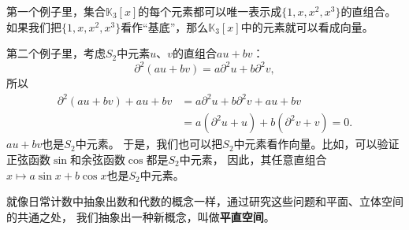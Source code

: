 \documentclass[12pt,UTF8]{ctexbook}
\begin{document}
第一个例子里，集合$\mathbb{K}_3[x]$的每个元素都可以唯一表示成$\{1, x, x^2, x^3\}$的直组合。
如果我们把$\{1, x, x^2, x^3\}$看作“基底”，那么$\mathbb{K}_3[x]$中的元素就可以看成向量。

第二个例子里，考虑$S_2$中元素$u$、$v$的直组合$au + bv$：
$$ \partial^2 (au + bv) = a \partial^2 u + b \partial^2 v,$$
所以
\begin{align*}
    \partial^2 (au + bv) + au + bv &= a \partial^2 u + b \partial^2 v + au + bv  \\
    &= a(\partial^2 u + u) + b(\partial^2 v + v) = 0.  
\end{align*}
$au + bv$也是$S_2$中元素。
于是，我们也可以把$S_2$中元素看作向量。比如，可以验证正弦函数$\sin$和余弦函数$\cos$都是$S_2$中元素，
因此，其任意直组合$x\mapsto a\sin{x} + b\cos{x}$也是$S_2$中元素。

就像日常计数中抽象出数和代数的概念一样，通过研究这些问题和平面、立体空间的共通之处，
我们抽象出一种新概念，叫做\textbf{平直空间}。
\end{document}
